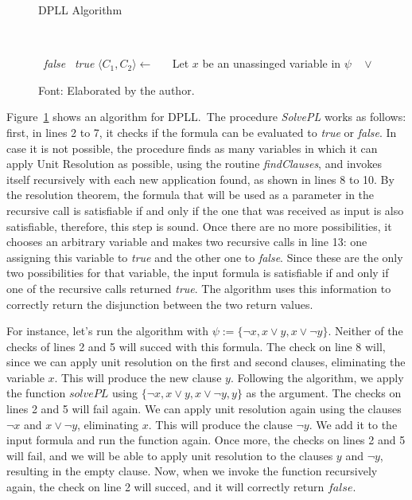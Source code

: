 \begin{figure}[t]
\caption{DPLL Algorithm}~\label{dpllAlgo}
\begin{algorithmic}[1]
  \State \Return~\textit{false}
\EndIf
{}
  \State \Return~\textit{true}
\EndIf
{}
  \State $\langle C_{1}, C_{2} \rangle \gets$  
  \State~\Return~
\EndIf
\State Let $x$ be an unassinged variable in $\psi$
\State \Return~ $\vee$ 
\EndFunction
\end{algorithmic}
\caption*{Font: Elaborated by the author.}
\end{figure}

Figure~\ref{dpllAlgo} shows an algorithm for DPLL.\ The procedure \textit{SolvePL} works as follows: first, in lines 2 to 7, it checks if the formula can be evaluated to \textit{true} or \textit{false}. In case it is not possible, the procedure finds as many variables in which it can apply Unit Resolution as possible, using the routine \textit{findClauses}, and invokes itself recursively with each new application found, as shown in lines 8 to 10. By the resolution theorem, the formula that will be used as a parameter in the recursive call is satisfiable if and only if the one that was received as input is also satisfiable, therefore, this step is sound. Once there are no more possibilities, it chooses an arbitrary variable and makes two recursive calls in line 13: one assigning this variable to \textit{true} and the other one to \textit{false}. Since these are the only two possibilities for that variable, the input formula is satisfiable if and only if one of the recursive calls returned \textit{true}. The algorithm uses this information to correctly return the disjunction between the two return values.

For instance, let's run the algorithm with $\psi := \{\neg x, x \vee y, x \vee \neg y\}$. Neither of the
checks of lines 2 and 5 will succed with this formula. The check on line 8 will, since we can apply unit resolution on the first and second clauses, eliminating the variable $x$. This will produce the new clause $y$.
Following the algorithm, we apply the function $solvePL$ using $\{\neg x, x \vee y, x \vee \neg y, y\}$ as the
argument. The checks on lines 2 and 5 will fail again. We can apply unit resolution again using the clauses $\neg x$ and $x \vee \neg y$, eliminating $x$. This will produce the clause $\neg y$. We add it to the input formula
and run the function again. Once more, the checks on lines 2 and 5 will fail, and we will be able to apply
unit resolution to the clauses $y$ and $\neg y$, resulting in the empty clause. Now, when we invoke the function
recursively again, the check on line 2 will succed, and it will correctly return $false$.

